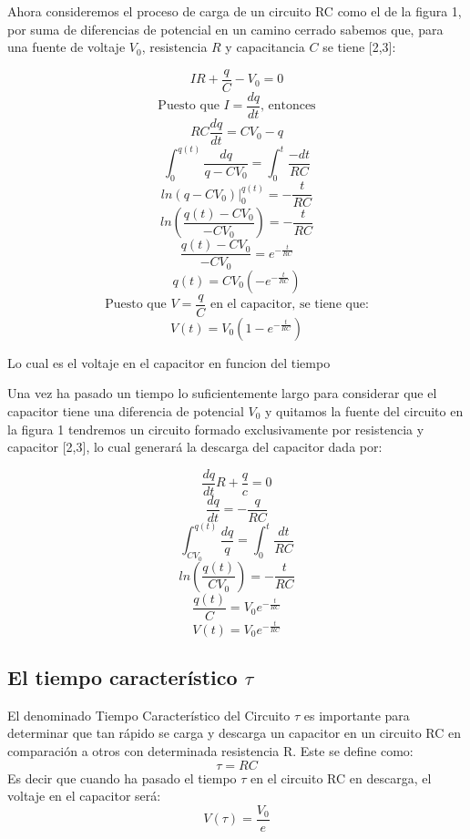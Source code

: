 \documentclass[10pt,letter]{article}
\begin{document}
\begin{multicols}{2}
Ahora consideremos el proceso de carga de un circuito RC como el de la figura 1, por suma de diferencias de potencial en un camino cerrado sabemos que, para una fuente de voltaje $V_0$, resistencia $R$ y capacitancia $C$ se tiene [2,3]: 

$$IR+\dfrac{q}{C}-V_0=0$$
$$\text{Puesto que } I=\dfrac{dq}{dt} \text{, entonces}$$
$$RC\dfrac{dq}{dt}=CV_0-q$$
$$\int_0^{q(t)}\dfrac{dq}{q-CV_0}=\int_0^t\dfrac{-dt}{RC}$$
$$ln(q-CV_0)|_0^{q(t)}=-\dfrac{t}{RC}$$
$$ln\left(\dfrac{q(t)-CV_0}{-CV_0}\right)=-\dfrac{t}{RC}$$
$$\dfrac{q(t)-CV_0}{-CV_0}=e^{-\frac{t}{RC}}$$
$$q(t)=CV_0\left(-e^{-\frac{t}{RC}}\right)$$
$$\text{Puesto que } V=\dfrac{q}{C} \text{ en el capacitor, se tiene que:}$$ 
\begin{equation}
V(t)=V_0\left(1-e^{-\frac{t}{RC}}\right)
\end{equation}

Lo cual es el voltaje en el capacitor en funcion del tiempo

\vspace{0.3cm}

Una vez ha pasado un tiempo lo suficientemente largo para considerar que el capacitor tiene una diferencia de potencial $V_0$ y quitamos la fuente del circuito en la figura 1 tendremos un circuito formado exclusivamente por resistencia y capacitor [2,3], lo cual generará la descarga del capacitor dada por:

$$\dfrac{dq}{dt}R+\dfrac{q}{c}=0$$
$$\dfrac{dq}{dt}=-\dfrac{q}{RC}$$
$$\int_{CV_0}^{q(t)}\dfrac{dq}{q}=\int_0^t\dfrac{dt}{RC}$$
$$ln\left(\dfrac{q(t)}{CV_0}\right)=-\dfrac{t}{RC}$$ 
$$\dfrac{q(t)}{C}=V_0e^{-\frac{t}{RC}}$$
\begin{equation}
V(t)=V_0e^{-\frac{t}{RC}}
\end{equation}
\subsection{El tiempo característico $\tau$ }
El denominado Tiempo Característico del Circuito $\tau$ es importante para determinar que tan rápido se carga y descarga un capacitor en un circuito RC en comparación a otros con determinada resistencia R. Este se define como:
\begin{equation}
\tau=RC
\end{equation}
Es decir que cuando ha pasado el tiempo $\tau$ en el circuito RC en descarga, el voltaje en el capacitor será:
\begin{equation}
V(\tau)=\dfrac{V_0}{e}
\end{equation}

\end{multicols}
\end{document}
